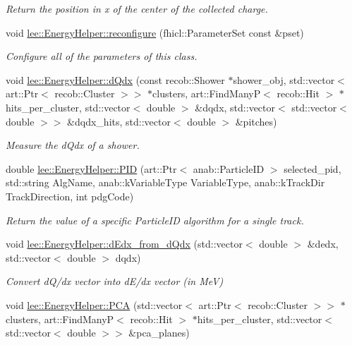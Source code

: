 \begin{DoxyCompactItemize}
\begin{DoxyCompactList}\small\item\em Return the position in x of the center of the collected charge. \end{DoxyCompactList}\item 
void \hyperlink{group__lee_ga4523185d78d6b7aa94dbf26475750282}{lee\-::\-Energy\-Helper\-::reconfigure} (fhicl\-::\-Parameter\-Set const \&pset)
\begin{DoxyCompactList}\small\item\em Configure all of the parameters of this class. \end{DoxyCompactList}\item 
void \hyperlink{group__lee_ga83891d9231c431e99e7615d02d570047}{lee\-::\-Energy\-Helper\-::d\-Qdx} (const recob\-::\-Shower $\ast$shower\-\_\-obj, std\-::vector$<$ art\-::\-Ptr$<$ recob\-::\-Cluster $>$$>$ $\ast$clusters, art\-::\-Find\-Many\-P$<$ recob\-::\-Hit $>$ $\ast$hits\-\_\-per\-\_\-cluster, std\-::vector$<$ double $>$ \&dqdx, std\-::vector$<$ std\-::vector$<$ double $>$$>$ \&dqdx\-\_\-hits, std\-::vector$<$ double $>$ \&pitches)
\begin{DoxyCompactList}\small\item\em Measure the d\-Qdx of a shower. \end{DoxyCompactList}\item 
double \hyperlink{group__lee_gab3e573f8d2d733f94b8ca862d7343864}{lee\-::\-Energy\-Helper\-::\-P\-I\-D} (art\-::\-Ptr$<$ anab\-::\-Particle\-I\-D $>$ selected\-\_\-pid, std\-::string Alg\-Name, anab\-::k\-Variable\-Type Variable\-Type, anab\-::k\-Track\-Dir Track\-Direction, int pdg\-Code)
\begin{DoxyCompactList}\small\item\em Return the value of a specific Particle\-I\-D algorithm for a single track. \end{DoxyCompactList}\item 
void \hyperlink{group__lee_ga2844c7f27f79fbe5e16d9c674ca4afa1}{lee\-::\-Energy\-Helper\-::d\-Edx\-\_\-from\-\_\-d\-Qdx} (std\-::vector$<$ double $>$ \&dedx, std\-::vector$<$ double $>$ dqdx)
\begin{DoxyCompactList}\small\item\em Convert d\-Q/dx vector into d\-E/dx vector (in Me\-V) \end{DoxyCompactList}\item 
void \hyperlink{group__lee_gac5f41d2b1bee9a0f761179f3059f8a49}{lee\-::\-Energy\-Helper\-::\-P\-C\-A} (std\-::vector$<$ art\-::\-Ptr$<$ recob\-::\-Cluster $>$$>$ $\ast$clusters, art\-::\-Find\-Many\-P$<$ recob\-::\-Hit $>$ $\ast$hits\-\_\-per\-\_\-cluster, std\-::vector$<$ std\-::vector$<$ double $>$$>$ \&pca\-\_\-planes)

\end{DoxyCompactItemize}
